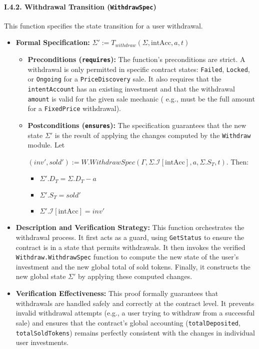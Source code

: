 \documentclass[
  english,
  onecolumn]{article}
\providecommand{\tightlist}{%
  \setlength{\itemsep}{0pt}\setlength{\parskip}{0pt}}
\begin{document}
\paragraph{\texorpdfstring{I.4.2. Withdrawal Transition
(\texttt{WithdrawSpec})}{I.4.2. Withdrawal Transition (WithdrawSpec)}}\label{i.4.2.-withdrawal-transition-withdrawspec}

This function specifies the state transition for a user withdrawal.

\begin{itemize}
\tightlist
\item
  \textbf{Formal Specification:}
  \(\Sigma' := T_{withdraw}(\Sigma, \text{intAcc}, a, t)\)

  \begin{itemize}
  \item
    \textbf{Preconditions (\texttt{requires}):} The function's
    preconditions are strict. A withdrawal is only permitted in specific
    contract states: \texttt{Failed}, \texttt{Locked}, or
    \texttt{Ongoing} for a \texttt{PriceDiscovery} sale. It also
    requires that the \texttt{intentAccount} has an existing investment
    and that the withdrawal \texttt{amount} is valid for the given sale
    mechanic ( e.g., must be the full amount for a \texttt{FixedPrice}
    withdrawal).
  \item
    \textbf{Postconditions (\texttt{ensures}):} The specification
    guarantees that the new state \(\Sigma'\) is the result of applying
    the changes computed by the \texttt{Withdraw} module. Let

    \((inv', sold') := W.WithdrawSpec(\Gamma, \Sigma.\mathcal{I}[\text{intAcc}], a, \Sigma.S_T, t)\).
    Then:

    \begin{itemize}
    \tightlist
    \item
      \(\Sigma'.D_T = \Sigma.D_T - a\)
    \item
      \(\Sigma'.S_T = sold'\)
    \item
      \(\Sigma'.\mathcal{I}[\text{intAcc}] = inv'\)
    \end{itemize}
  \end{itemize}
\item
  \textbf{Description and Verification Strategy:} This function
  orchestrates the withdrawal process. It first acts as a guard, using
  \texttt{GetStatus} to ensure the contract is in a state that permits
  withdrawals. It then invokes the verified
  \texttt{Withdraw.WithdrawSpec} function to compute the new state of
  the user's investment and the new global total of sold tokens.
  Finally, it constructs the new global state \(\Sigma'\) by applying
  these computed changes.
\item
  \textbf{Verification Effectiveness:} This proof formally guarantees
  that withdrawals are handled safely and correctly at the contract
  level. It prevents invalid withdrawal attempts (e.g., a user trying to
  withdraw from a successful sale) and ensures that the contract's
  global accounting (\texttt{totalDeposited}, \texttt{totalSoldTokens})
  remains perfectly consistent with the changes in individual user
  investments.
\end{itemize}
\end{document}
